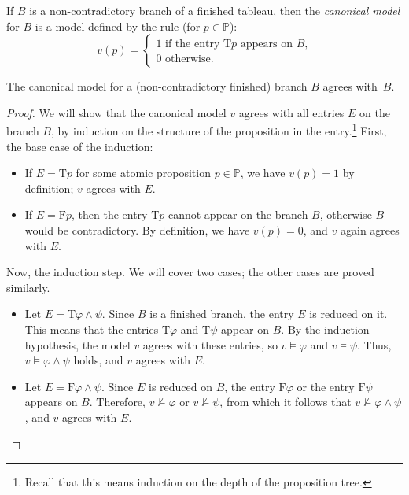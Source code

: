 \begin{definition}\label{definition:canonical-model}
If $B$ is a non-contradictory branch of a finished tableau, then the \emph{canonical model} for $B$ is a model defined by the rule (for $p \in \mathbb{P}$):
$$
v(p)=\begin{cases}
    1 \text{ if the entry $\mathrm{T}p$ appears on $B$,}\\
    0 \text{ otherwise.}
\end{cases}
$$  
\end{definition}
\begin{lemma}\label{lemma:canonical-model-agrees}
    The canonical model for a (non-contradictory finished) branch $B$ agrees with~$B$.
\end{lemma}
\begin{proof}
We will show that the canonical model $v$ agrees with all entries $E$ on the branch $B$, by induction on the structure of the proposition in the entry.\footnote{Recall that this means induction on the depth of the proposition tree.} First, the base case of the induction:
\begin{itemize}
    \item If $E = \mathrm{T}p$ for some atomic proposition $p \in \mathbb{P}$, we have $v(p) = 1$ by definition; $v$ agrees with $E$.
    \item If $E = \mathrm{F}p$, then the entry $\mathrm{T}p$ cannot appear on the branch $B$, otherwise $B$ would be contradictory. By definition, we have $v(p) = 0$, and $v$ again agrees with $E$.
\end{itemize}
Now, the induction step. We will cover two cases; the other cases are proved similarly.
\begin{itemize}
    \item Let $E = \mathrm{T}\varphi \land \psi$. Since $B$ is a finished branch, the entry $E$ is reduced on it. This means that the entries $\mathrm{T}\varphi$ and $\mathrm{T}\psi$ appear on $B$. By the induction hypothesis, the model $v$ agrees with these entries, so $v \models \varphi$ and $v \models \psi$. Thus, $v \models \varphi \land \psi$ holds, and $v$ agrees with $E$.
    \item Let $E = \mathrm{F}\varphi \land \psi$. Since $E$ is reduced on $B$, the entry $\mathrm{F}\varphi$ or the entry $\mathrm{F}\psi$ appears on $B$. Therefore, $v \not\models \varphi$ or $v \not\models \psi$, from which it follows that $v \not\models \varphi \land \psi$, and $v$ agrees with $E$.
\end{itemize}
\end{proof}

